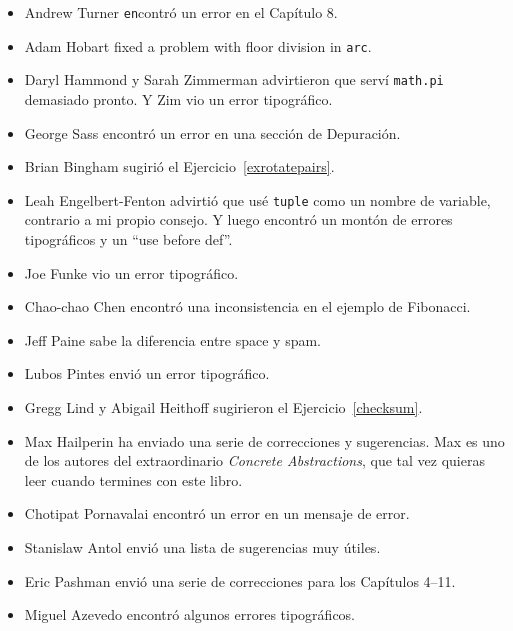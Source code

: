\documentclass[10pt]{book}
\begin{document}
\begin{itemize}
\item Andrew Turner {\tt en}contró un error en el Capítulo 8.

\item Adam Hobart fixed a problem with floor division in {\tt arc}.

\item Daryl Hammond y Sarah Zimmerman advirtieron que serví
{\tt math.pi} demasiado pronto.  Y Zim vio un error tipográfico.

\item George Sass encontró un error en una sección de Depuración.

\item Brian Bingham sugirió el Ejercicio~\ref{exrotatepairs}.

\item Leah Engelbert-Fenton advirtió que usé {\tt tuple}
como un nombre de variable, contrario a mi propio consejo.  Y luego encontró
un montón de errores tipográficos y un ``use before def''.

\item Joe Funke vio un error tipográfico.

\item Chao-chao Chen encontró una inconsistencia en el ejemplo de Fibonacci.

\item Jeff Paine sabe la diferencia entre space y spam.

\item Lubos Pintes envió un error tipográfico.

\item Gregg Lind y Abigail Heithoff sugirieron el Ejercicio~\ref{checksum}.

\item Max Hailperin ha enviado una serie de correcciones y
  sugerencias.  Max es uno de los autores del extraordinario {\em
    Concrete Abstractions}, que tal vez quieras leer cuando termines
  con este libro.

\item Chotipat Pornavalai encontró un error en un mensaje de error.

\item Stanislaw Antol envió una lista de sugerencias muy útiles.

\item Eric Pashman envió una serie de correcciones para los Capítulos 4--11.

\item Miguel Azevedo encontró algunos errores tipográficos.


\end{itemize}
\end{document}
